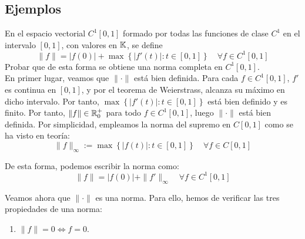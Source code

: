 \newpage\subsection{Ejemplos}

\begin{ejercicio}
En el espacio vectorial $C^1\left[0, 1\right]$ formado por todas las funciones de clase $C^1$ en el intervalo $\left[0, 1\right]$, con valores en $\mathbb{K}$, se define
\[
\|f\| = |f(0)| + \max\left\{ |f'(t)| : t \in \left[0, 1\right] \right\} \quad \forall f \in C^1\left[0, 1\right]
\]
Probar que de esta forma se obtiene una norma completa en $C^1\left[0, 1\right]$.\\

    En primer lugar, veamos que $\|\cdot\|$ está bien definida. Para cada $f\in C^1\left[0, 1\right]$, $f'$ es continua en $\left[0, 1\right]$, y por el teorema de Weierstrass, alcanza su máximo en dicho intervalo. Por tanto, $\max\left\{ |f'(t)| : t \in \left[0, 1\right] \right\}$ está bien definido y es finito. Por tanto, $\|f\|\in \mathbb{R}^+_0$ para todo $f \in C^1\left[0, 1\right]$, luego $\|\cdot\|$ está bien definida. Por simplicidad, empleamos la norma del supremo en $C\left[0, 1\right]$ como se ha visto en teoría:
    \begin{equation*}
        \|f\|_\infty := \max\left\{ |f(t)| : t \in \left[0, 1\right] \right\} \quad \forall f \in C\left[0, 1\right]
    \end{equation*}

    De esta forma, podemos escribir la norma como:
    \begin{equation*}
        \|f\| = |f(0)| + \|f'\|_\infty \quad \forall f \in C^1\left[0, 1\right]
    \end{equation*}

    Veamos ahora que $\|\cdot\|$ es una norma. Para ello, hemos de verificar las tres propiedades de una norma:
    \begin{enumerate}
        \item $\|f\| = 0 \iff f = 0$.
        

\end{enumerate}
\end{ejercicio}
